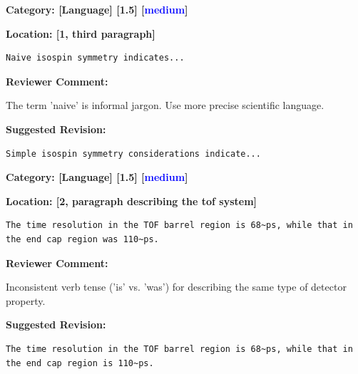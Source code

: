\documentclass[12pt]{article}
\begin{document}
\begin{reviewer}
\noindent \textbf{Category: [Language] [1.5] [\textcolor{blue}{medium}]}

\noindent \textbf{Location: [1, third paragraph]}

\begin{lstlisting}[breaklines=true]
	Naive isospin symmetry indicates...
\end{lstlisting}

\textbf{Reviewer Comment:}

The term 'naive' is informal jargon. Use more precise scientific language.

\textbf{Suggested Revision:}

\begin{lstlisting}[breaklines=true]
	Simple isospin symmetry considerations indicate...
\end{lstlisting}

\end{reviewer}

\begin{reviewer}
\noindent \textbf{Category: [Language] [1.5] [\textcolor{blue}{medium}]}

\noindent \textbf{Location: [2, paragraph describing the tof system]}

\begin{lstlisting}[breaklines=true]
	The time resolution in the TOF barrel region is 68~ps, while that in the end cap region was 110~ps.
\end{lstlisting}

\textbf{Reviewer Comment:}

Inconsistent verb tense ('is' vs. 'was') for describing the same type of detector property.

\textbf{Suggested Revision:}

\begin{lstlisting}[breaklines=true]
	The time resolution in the TOF barrel region is 68~ps, while that in the end cap region is 110~ps.
\end{lstlisting}

\end{reviewer}
\end{document}
